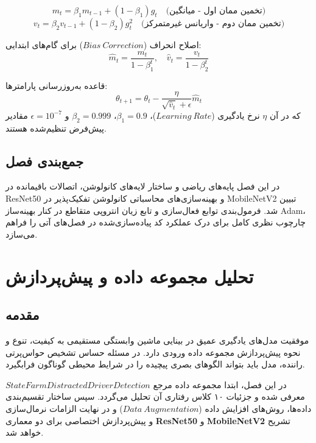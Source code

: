 \documentclass{report}
\begin{document}
 	\begin{equation}
 		m_t = \beta_1 m_{t-1} + (1 - \beta_1) g_t \quad \text{(تخمین ممان اول - میانگین)}
 	\end{equation}
 	\begin{equation}
 		v_t = \beta_2 v_{t-1} + (1 - \beta_2) g_t^2 \quad \text{(تخمین ممان دوم - واریانس غیرمتمرکز)}
 	\end{equation}
 	
 	اصلاح انحراف ($Bias\ Correction$) برای گام‌های ابتدایی:
 	\begin{equation}
 		\hat{m}_t = \frac{m_t}{1 - \beta_1^t}, \quad \hat{v}_t = \frac{v_t}{1 - \beta_2^t}
 	\end{equation}
 	
 	قاعده به‌روزرسانی پارامترها:
 	\begin{equation}
 		\theta_{t+1} = \theta_t - \frac{\eta}{\sqrt{\hat{v}_t} + \epsilon} \hat{m}_t
 	\end{equation}
 	که در آن $\eta$ نرخ یادگیری ($Learning\ Rate$)، $\beta_1 = 0.9$، $\beta_2 = 0.999$ و $\epsilon = 10^{-7}$ مقادیر پیش‌فرض تنظیم‌شده هستند.
 	
 	\section{جمع‌بندی فصل}
 	در این فصل پایه‌های ریاضی و ساختار لایه‌های کانولوشن، اتصالات باقیمانده در ResNet50 و بهینه‌سازی‌های محاسباتی کانولوشن تفکیک‌پذیر در MobileNetV2 تبیین شد. فرمول‌بندی توابع فعال‌سازی و تابع زیان انتروپی متقاطع در کنار بهینه‌ساز Adam، چارچوب نظری کامل برای درک عملکرد کد پیاده‌سازی‌شده در فصل‌های آتی را فراهم می‌سازد.
 	
 	
 	
 	
 	
 	
 	
 	\chapter{تحلیل مجموعه داده و پیش‌پردازش}
 	
 	\section{مقدمه}
 	موفقیت مدل‌های یادگیری عمیق در بینایی ماشین وابستگی مستقیمی به کیفیت، تنوع و نحوه پیش‌پردازش مجموعه داده ورودی دارد. در مسئله حساس تشخیص حواس‌پرتی راننده، مدل باید بتواند الگوهای بصری پیچیده را در شرایط محیطی گوناگون فرابگیرد.
 	
 	در این فصل، ابتدا مجموعه داده مرجع \textbf{$State Farm Distracted Driver Detection$} معرفی شده و جزئیات ۱۰ کلاس رفتاری آن تحلیل می‌گردد. سپس ساختار تقسیم‌بندی داده‌ها، روش‌های افزایش داده ($Data\ Augmentation$) و در نهایت الزامات نرمال‌سازی و پیش‌پردازش اختصاصی برای دو معماری \textbf{ResNet50} و \textbf{MobileNetV2} تشریح خواهد شد.
 	
\end{document}
